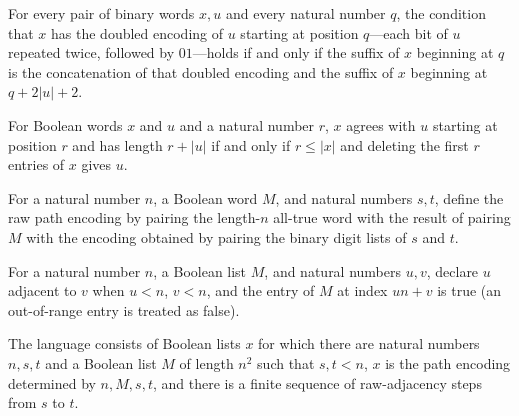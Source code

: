 \begin{lemma}
\label{Complexity.dblAt_iff}
\leanok
{}
For every pair of binary words $x,u$ and every natural number $q$, the condition that
$x$ has the doubled encoding of $u$ starting at position $q$—each bit of $u$ repeated
twice, followed by $01$—holds if and only if the suffix of $x$ beginning at $q$ is the
concatenation of that doubled encoding and the suffix of $x$ beginning at $q+2|u|+2$.
\end{lemma}

\begin{lemma}
\label{Complexity.plainAt_iff}
\leanok
{}
For Boolean words $x$ and $u$ and a natural number $r$, $x$ agrees with $u$ starting at
position $r$ and has length $r+|u|$ if and only if $r\le |x|$ and deleting the first $r$
entries of $x$ gives $u$.
\end{lemma}

\begin{definition}
\label{Complexity.pathRaw}
\leanok
{}
For a natural number $n$, a Boolean word $M$, and natural numbers $s,t$, define the raw
path encoding by pairing the length-$n$ all-true word with the result of pairing $M$
with the encoding obtained by pairing the binary digit lists of $s$ and $t$.
\end{definition}

\begin{definition}
\label{Complexity.rawEdge}
\leanok
For a natural number $n$, a Boolean list $M$, and natural numbers $u,v$, declare $u$
adjacent to $v$ when $u<n$, $v<n$, and the entry of $M$ at index $un+v$ is true (an
out-of-range entry is treated as false).
\end{definition}

\begin{definition}
\label{Complexity.pathRawLang}
\leanok
{}
The language consists of Boolean lists $x$ for which there are natural numbers $n,s,t$
and a Boolean list $M$ of length $n^2$ such that $s,t<n$, $x$ is the path encoding
determined by $n,M,s,t$, and there is a finite sequence of raw-adjacency steps from $s$
to $t$.
\end{definition}

